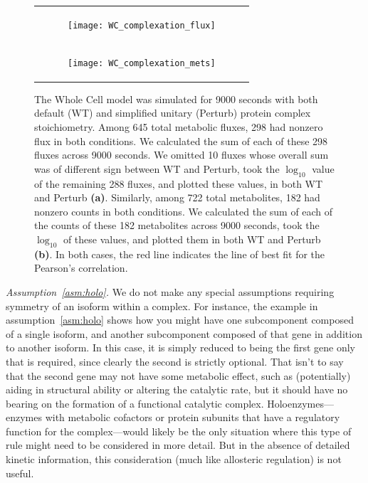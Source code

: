 \begin{figure}[!htb]
\centering
\begin{tabular}{c}
  \begin{subfigure}[b]{0.75\textwidth}
  \texttt{[image: WC\_complexation\_flux]}
  \caption{} \label{fig:WCComplexationFlux:A}
  \end{subfigure}
\\
  \begin{subfigure}[b]{0.75\textwidth}
  \texttt{[image: WC\_complexation\_mets]}
  \caption{} \label{fig:WCComplexationFlux:B}
  \end{subfigure} 
\\
\end{tabular}
\caption{The Whole Cell model was simulated for 9000 seconds with both
default (WT) and simplified unitary (Perturb) protein complex
stoichiometry. Among 645 total metabolic fluxes, 298 had nonzero flux
in both conditions. We calculated the sum of each of these 298 fluxes
across 9000 seconds. We omitted 10 fluxes whose overall sum was of
different sign between WT and Perturb, took the $\log_{10}$ value of
the remaining 288 fluxes, and plotted these values, in both WT and
Perturb \textbf{(a)}. Similarly, among 722 total metabolites, 182 had
nonzero counts in both conditions. We calculated the sum of each of
the counts of these 182 metabolites across 9000 seconds, took the
$\log_{10}$ of these values, and plotted them in both WT and Perturb
\textbf{(b)}. In both cases, the red line indicates the line of best
fit for the Pearson's correlation.}
\label{fig:WCComplexationFlux}
\end{figure}
\FloatBarrier

\emph{Assumption~\ref{asm:holo}.}
We do not make any special assumptions requiring symmetry of an
isoform within a complex. For instance, the example in
assumption~\ref{asm:holo} shows how you might have one subcomponent
composed of a single isoform, and another subcomponent composed of
that gene in addition to another isoform. In this case, it is simply
reduced to being the first gene only that is required, since clearly
the second is strictly optional. That isn't to say that the second
gene may not have some metabolic effect, such as (potentially) aiding in
structural ability or altering the catalytic rate, but it should have
no bearing on the formation of a functional catalytic
complex. Holoenzymes---enzymes with metabolic cofactors or protein
subunits that have a regulatory function for the complex---would
likely be the only situation where this type of rule might need to be
considered in more detail. But in the absence of detailed kinetic
information, this consideration (much like allosteric
regulation) is not useful.

